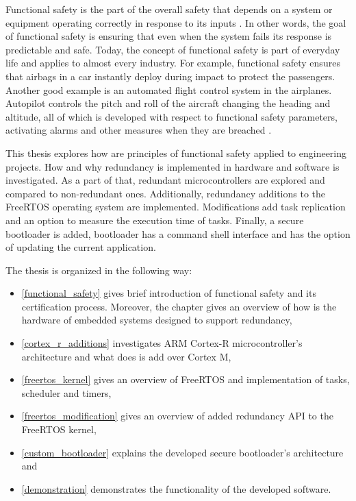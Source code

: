 Functional safety is the part of the overall safety that depends on a system or equipment operating correctly in response to its inputs \cite{func_safety_brief}. In other words, the goal of functional safety is ensuring that even when the system fails its response is predictable and safe. Today, the concept of functional safety is part of everyday life and applies to almost every industry. For example, functional safety ensures that airbags in a car instantly deploy during impact to protect the passengers. Another good example is an automated flight control system in the airplanes. Autopilot controls the pitch and roll of the aircraft changing the heading and altitude, all of which is developed with respect to functional safety parameters, activating alarms and other measures when they are breached \cite{func_safety_brief}.

This thesis explores how are principles of functional safety applied to engineering projects. How and why redundancy is implemented in hardware and software is investigated. As a part of that, redundant microcontrollers are explored and compared to non-redundant ones. Additionally, redundancy additions to the FreeRTOS operating system are implemented. Modifications add task replication and an option to measure the execution time of tasks. Finally, a secure bootloader is added, bootloader has a command shell interface and has the option of updating the current application.

\noindent The thesis is organized in the following way:

\begin{itemize}

    \item \autoref{functional_safety} gives brief introduction of functional safety and its certification process. Moreover, the chapter gives an overview of how is the hardware of embedded systems designed to support redundancy,
    \item \autoref{cortex_r_additions} investigates ARM Cortex-R microcontroller's architecture and what does is add over Cortex M,
    \item \autoref{freertos_kernel} gives an overview of FreeRTOS and implementation of tasks, scheduler and timers,
    \item \autoref{freertos_modification} gives an overview of added redundancy API to the FreeRTOS kernel,
    \item \autoref{custom_bootloader} explains the developed secure bootloader's architecture and
    \item \autoref{demonstration} demonstrates the functionality of the developed software.
    
\end{itemize}
   